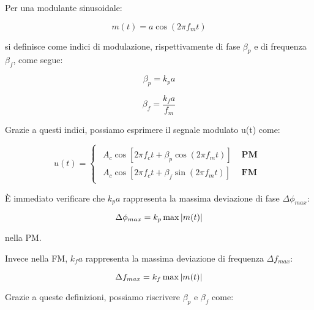 Per una modulante sinusoidale: 

{
    \Large 
    \begin{equation}
        m(t) = a \cos(2 \pi f_m t)
    \end{equation}
}

si definisce come indici di modulazione, rispettivamente di fase $\beta_p$ e di frequenza $\beta_f$, come segue: 

{
    \Large 
    \begin{equation}
        \beta_p = k_p a
    \end{equation}
}

{
    \Large 
    \begin{equation}
        \beta_f = \frac{k_f a}{f_m}
    \end{equation}
}

Grazie a questi indici, possiamo esprimere il segnale modulato u(t) come: 

{
    \Large 
    \begin{equation}
        u(t)
        = 
        \begin{cases}
            \begin{array}{ll}
            A_c \cos \left[ 2 \pi f_c t + \beta_p \cos(2 \pi f_m t)\right] & \textbf{ PM} 
            \\
            A_c \cos \left[ 2 \pi f_c t + \beta_f \sin(2 \pi f_m t)\right] & \textbf{ FM}
            \end{array} 
        \end{cases}
    \end{equation}
}

È immediato verificare che $k_p a$ rappresenta la massima deviazione di fase $\Delta \phi_{max}$: 

{
    \Large 
    \begin{equation}
        \Delta \phi_{max}
        = 
        k_p \max \abs{m(t)}
    \end{equation}
}

nella PM. \newline 

Invece nella FM, $k_f a$ rappresenta la massima deviazione di frequenza $\Delta f_{max}$: 

{
    \Large 
    \begin{equation}
    \Delta f_{max}
        = 
        k_f \max \abs{m(t)}
    \end{equation}
} 

Grazie a queste definizioni, possiamo riscrivere $\beta_p$ e $\beta_f$ come: 

